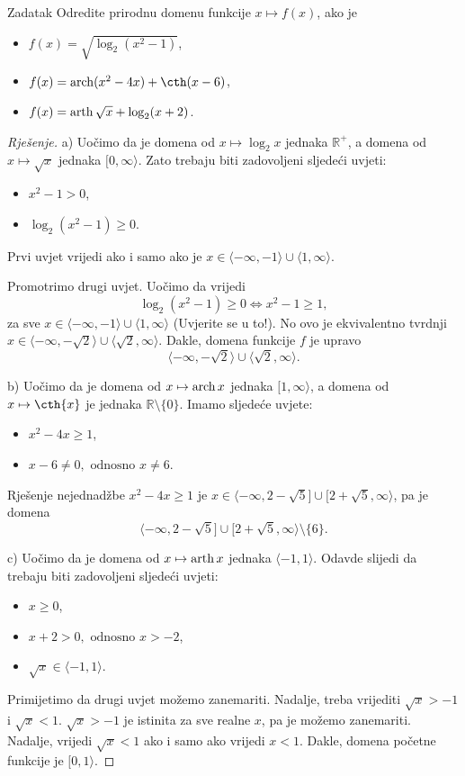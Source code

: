 \begin{exercise}{Zadatak}
Odredite prirodnu domenu funkcije \(x\mapsto f(x)\), ako je
\begin{itemize}
\item[a)] \(f(x)=\sqrt{\log_2(x^2-1)}\),
\item[b)] \(f(x)=\arcosh(x^2-4x)+\cth(x-6)\),
\item[c)] \(f(x)=\operatorname{arth}{\sqrt{x}}+\log_2(x+2)\).
\end{itemize}
\end{exercise}
\begin{proof}[Rješenje]
a) Uočimo da je domena od \(x\mapsto \log_2{x}\) jednaka \(\mathbb{R}^+\), a domena od \(x\mapsto \sqrt{x}\) jednaka \([0, \infty\rangle\). Zato trebaju biti zadovoljeni sljedeći uvjeti:
\begin{itemize}
\item \(x^2-1>0\),
\item \(\log_2(x^2-1)\geq 0\).
\end{itemize}
Prvi uvjet vrijedi ako i samo ako je \(x\in \langle-\infty, -1\rangle\cup \langle 1, \infty\rangle\).

Promotrimo drugi uvjet. Uočimo da vrijedi \[\log_2(x^2-1)\geq 0\Leftrightarrow x^2-1\geq 1,\]
za sve \(x\in \langle-\infty, -1\rangle\cup \langle 1, \infty\rangle\) (Uvjerite se u to!). No ovo je ekvivalentno tvrdnji \(x\in \langle-\infty, -\sqrt{2}\rangle\cup \langle \sqrt{2}, \infty\rangle\). Dakle, domena funkcije \(f\) je upravo \[\langle-\infty, -\sqrt{2}\rangle\cup \langle \sqrt{2}, \infty\rangle.\]

b) Uočimo da je domena od \(x\mapsto \operatorname{arch}{x}\) jednaka \([1, \infty\rangle\), a domena od \(x\mapsto \cth{x}\) je jednaka \(\mathbb{R}\setminus\{0\}\). Imamo sljedeće uvjete:
\begin{itemize}
\item \(x^2-4x\geq 1\),
\item \(x-6\neq 0,\text{ odnosno } x\neq 6\).
\end{itemize}
Rješenje nejednadžbe \(x^2-4x\geq 1\) je \(x\in \langle -\infty, 2-\sqrt{5}]\cup [2+\sqrt{5}, \infty\rangle\), pa je domena
\[\langle -\infty, 2-\sqrt{5}]\cup [2+\sqrt{5}, \infty\rangle\setminus\{6\}.\]

c) Uočimo da je domena od \(x\mapsto \operatorname{arth}{x}\) jednaka \(\langle -1, 1\rangle\). Odavde slijedi da trebaju biti zadovoljeni sljedeći uvjeti:
\begin{itemize}
\item \(x\geq 0\),
\item \(x+2>0,\text{ odnosno }x>-2\),
\item \(\sqrt{x}\in \langle -1, 1\rangle\).
\end{itemize}
Primijetimo da drugi uvjet možemo zanemariti. Nadalje, treba vrijediti \(\sqrt{x}>-1\) i \(\sqrt{x}<1\). \(\sqrt{x}>-1\) je istinita za sve realne \(x\), pa je možemo zanemariti. Nadalje, vrijedi \(\sqrt{x}<1\) ako i samo ako vrijedi \( x<1\). Dakle, domena početne funkcije je \([0, 1\rangle\).
\end{proof}
